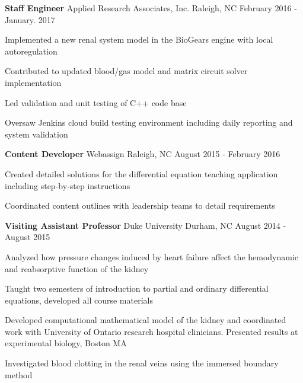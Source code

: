 \begin{cventries}
  \cventry
    {\textbf{Staff Engineer}}%
    {Applied Research Associates, Inc.} %
    {Raleigh, NC} %
    {February 2016 - January. 2017} %
    {
      \begin{cvitems} %
        \item {Implemented a new renal system model in the BioGears engine with local autoregulation}
        \item {Contributed to updated blood/gas model and matrix circuit solver implementation}
        \item {Led validation and unit testing of C++ code base}
        \item {Oversaw Jenkins cloud build testing environment including daily reporting and system validation}
      \end{cvitems}
    }

  \cventry
    {\textbf{Content Developer}} %
    {Webassign} %
    {Raleigh, NC} %
    {August 2015 - February 2016} %
    {
      \begin{cvitems} %
        \item {Created detailed solutions for the differential equation teaching application including step-by-step instructions}
        \item {Coordinated content outlines with leadership teams to detail requirements}
      \end{cvitems}
    }

  \cventry
    {\textbf{Visiting Assistant Professor}} %
    {Duke University} %
    {Durham, NC} %
    {August 2014 - August 2015} %
    {
      \begin{cvitems} %
        \item {Analyzed how pressure changes induced by heart failure affect the hemodynamic and reabsorptive
function of the kidney}
		    \item {Taught two semesters of introduction to partial and ordinary differential equations, developed all course materials}
        \item {Developed computational mathematical model of the kidney and coordinated work with University of Ontario research hospital clinicians. Presented results at experimental biology, Boston MA}
        \item {Investigated blood clotting in the renal veins using the immersed boundary method}
      \end{cvitems}
    }


\end{cventries}
